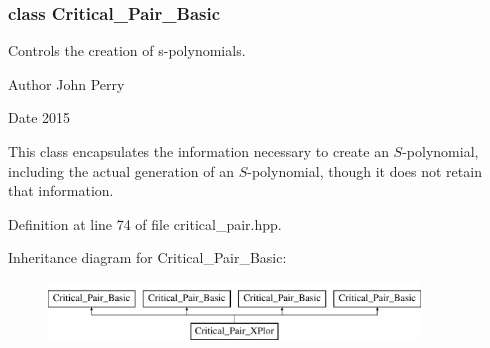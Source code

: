 \subsubsection{class Critical\+\_\+\+Pair\+\_\+\+Basic}
Controls the creation of s-\/polynomials. 

\begin{DoxyAuthor}{Author}
John Perry 
\end{DoxyAuthor}
\begin{DoxyDate}{Date}
2015
\end{DoxyDate}
This class encapsulates the information necessary to create an $S$-\/polynomial, including the actual generation of an $S$-\/polynomial, though it does not retain that information. 

Definition at line 74 of file critical\+\_\+pair.\+hpp.

Inheritance diagram for Critical\+\_\+\+Pair\+\_\+\+Basic\+:\begin{figure}[H]
\begin{center}
\leavevmode
\includegraphics[height=1.534247cm]{group___g_b_computation}
\end{center}
\end{figure}
